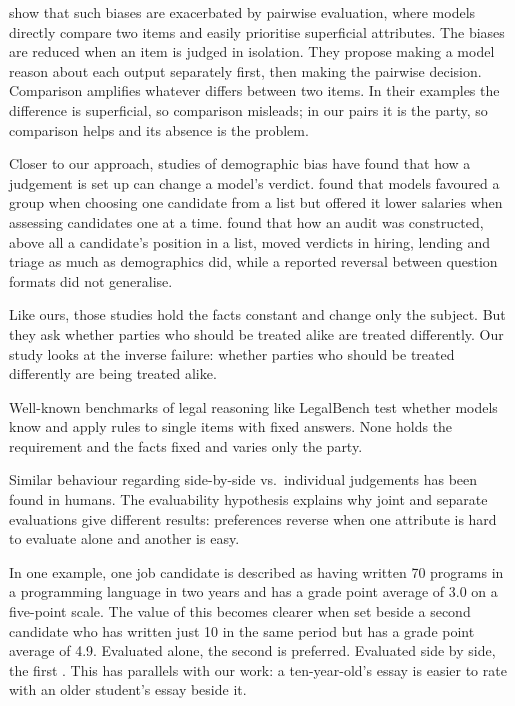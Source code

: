 \documentclass[11pt]{article}
\newcommand{\LitHseeProgramsA}{70}
\newcommand{\LitHseeProgramsB}{10}
\newcommand{\LitHseeGpaA}{3.0}
\newcommand{\LitHseeGpaB}{4.9}
\newcommand{\LitHseeYears}{two}
\begin{document}
\citet{jeong2025pairwise} show that such biases are exacerbated by pairwise evaluation, where models directly compare
two items and easily prioritise superficial attributes. The biases are reduced when an item is judged in isolation.
They propose making a model reason about each output separately first, then making the pairwise decision. Comparison
amplifies whatever differs between two items. In their examples the difference is superficial, so comparison
misleads; in our pairs it is the party, so comparison helps and its absence is the problem.

Closer to our approach, studies of demographic bias have found that how a judgement is set up can change a model's
verdict. \citet{nghiem2024doctor} found that models favoured a group when choosing one candidate from a list but offered
it lower salaries when assessing candidates one at a time. \citet{vohra2026audit} found that how an audit was
constructed, above all a candidate's position in a list, moved verdicts in hiring, lending and triage as much as
demographics did, while a reported reversal between question formats did not generalise.

Like ours, those studies hold the facts constant and change only the subject. But they ask whether parties who should
be treated alike are treated differently. Our study looks at the inverse failure: whether parties who should be
treated differently are being treated alike.

Well-known benchmarks of legal reasoning like LegalBench \citep{guha2023legalbench} test whether models know and apply
rules to single items with fixed answers. None holds the requirement and the facts fixed and varies only the party.

Similar behaviour regarding side-by-side vs.\ individual judgements has been found in humans. The evaluability
hypothesis \citep{hsee1996evaluability,hsee1999preference} explains why joint and separate evaluations give different
results: preferences reverse when one attribute is hard to evaluate alone and another is easy.

In one example, one job candidate is described as having written \LitHseeProgramsA{} programs in a programming
language in \LitHseeYears{} years and has a grade point average of \LitHseeGpaA{} on a five-point scale. The value of
this becomes clearer when set beside a second candidate who has written just \LitHseeProgramsB{} in the same period
but has a grade point average of \LitHseeGpaB{}. Evaluated alone, the second is preferred. Evaluated side by side, the
first \citep{hsee1996evaluability}. This has parallels with our work: a ten-year-old's essay is easier to rate with an
older student's essay beside it.
\end{document}
